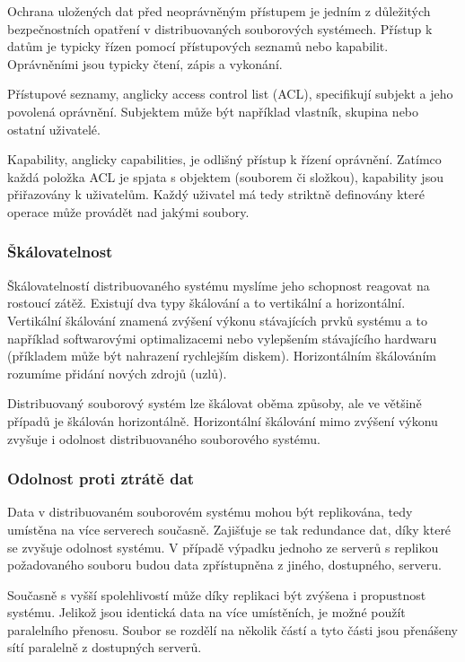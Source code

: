 \documentclass[czech,DP]{thesiskiv}
\begin{document}
Ochrana uložených dat před neoprávněným přístupem je jedním z důležitých bezpečnostních opatření v distribuovaných souborových systémech. Přístup k datům je typicky řízen pomocí přístupových seznamů nebo kapabilit. Oprávněními jsou typicky čtení, zápis a vykonání.

Přístupové seznamy, anglicky access control list (ACL), specifikují subjekt a jeho povolená oprávnění. Subjektem může být například vlastník, skupina nebo ostatní uživatelé. 

Kapability, anglicky capabilities, je odlišný přístup k řízení oprávnění. Zatímco každá položka ACL je spjata s objektem (souborem či složkou), kapability jsou přiřazovány k uživatelům. Každý uživatel má tedy striktně definovány které operace může provádět nad jakými soubory.

\subsubsection*{Škálovatelnost}

Škálovatelností distribuovaného systému myslíme jeho schopnost reagovat na rostoucí zátěž. Existují dva typy škálování a to vertikální a horizontální. Vertikální škálování znamená zvýšení výkonu stávajících prvků systému a to například softwarovými optimalizacemi nebo vylepšením stávajícího hardwaru (příkladem může být nahrazení rychlejším diskem). Horizontálním škálováním rozumíme přidání nových zdrojů (uzlů). 

Distribuovaný souborový systém lze škálovat oběma způsoby, ale ve většině případů je škálován horizontálně. Horizontální škálování mimo zvýšení výkonu zvyšuje i odolnost distribuovaného souborového systému.

\subsubsection*{Odolnost proti ztrátě dat}

Data v distribuovaném souborovém systému mohou být replikována, tedy umístěna na více serverech současně. Zajišťuje se tak redundance dat, díky které se zvyšuje odolnost systému. V případě výpadku jednoho ze serverů s replikou požadovaného souboru budou data zpřístupněna z jiného, dostupného, serveru.

Současně s vyšší spolehlivostí může díky replikaci být zvýšena i propustnost systému. Jelikož jsou identická data na více umístěních, je možné použít paralelního přenosu. Soubor se rozdělí na několik částí a tyto části jsou přenášeny sítí paralelně z dostupných serverů. 
\end{document}
